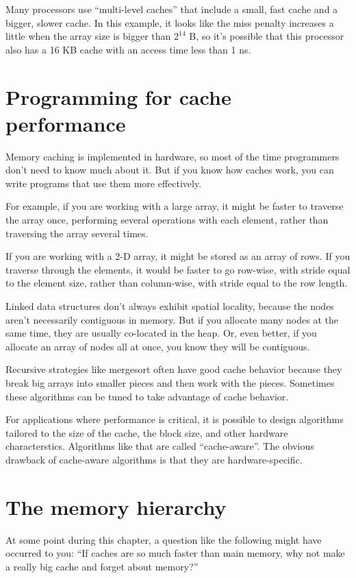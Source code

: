 \documentclass[12pt]{book}
\begin{document}
{Many processors use ``multi-level caches'' that include a small,
fast cache and a bigger, slower cache.  In this example, it looks 
like the miss penalty increases a little when the array size is bigger
than $2^{14}$ B, so it's possible that this processor also has a 16 KB
cache with an access time less than 1 ns.


\section{Programming for cache performance}

Memory caching is implemented in hardware, so most of the time
programmers don't need to know much about it.  But if you know how
caches work, you can write programs that use them more effectively.

For example, if you are working with a large array, it might be
faster to traverse the array once, performing several operations with
each element, rather than traversing the array several times.

If you are working with a 2-D array, it might be stored as an array
of rows.  If you traverse through the elements, it would be faster
to go row-wise, with stride equal to the element size, rather
than column-wise, with stride equal to the row length.

Linked data structures don't always exhibit spatial locality, because
the nodes aren't necessarily contiguous in memory.  But if you allocate
many nodes at the same time, they are usually co-located in the heap.
Or, even better, if you allocate an array of nodes all at once, you
know they will be contiguous.

Recursive strategies like mergesort often have good cache behavior
because they break big arrays into smaller pieces and then work
with the pieces.  Sometimes these algorithms can be tuned to take
advantage of cache behavior.

For applications where performance is critical, it is possible
to design algorithms tailored to the size of the cache, the block size,
and other hardware characterstics.  Algorithms like that are
called ``cache-aware''.  The obvious drawback of cache-aware
algorithms is that they are hardware-specific.


\section{The memory hierarchy}

At some point during this chapter, a question like the following
might have occurred to you: ``If caches are so much faster than
main memory, why not make a really big cache and forget about
memory?''

}
\end{document}
